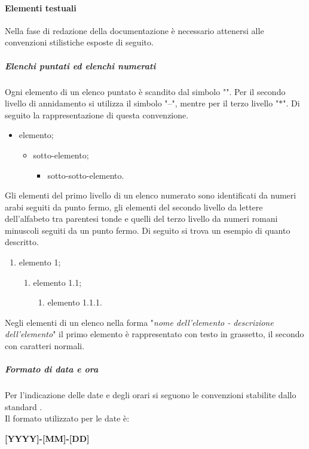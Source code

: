 \paragraph{Elementi testuali}
Nella fase di redazione della documentazione è necessario attenersi alle convenzioni stilistiche esposte di seguito.
\subparagraph{Elenchi puntati ed elenchi numerati}
Ogni elemento di un elenco puntato è scandito dal simbolo "\textbullet". Per il secondo livello di annidamento si utilizza il simbolo "--", mentre per il terzo livello "$\ast$". Di seguito la rappresentazione di questa convenzione.
\begin{itemize}
    \item elemento;
    \begin{itemize}
        \item sotto-elemento;
        \begin{itemize}
            \item sotto-sotto-elemento.
        \end{itemize}
    \end{itemize}
\end{itemize}
Gli elementi del primo livello di un elenco numerato sono identificati da numeri arabi seguiti da punto fermo, gli elementi del secondo livello da lettere dell'alfabeto tra parentesi tonde e quelli del terzo livello da numeri romani minuscoli seguiti da  un punto fermo. Di seguito si trova un esempio di quanto descritto.
\begin{enumerate}
    \item elemento 1;
    \begin{enumerate}
        \item elemento 1.1;
        \begin{enumerate}
            \item elemento 1.1.1.
        \end{enumerate}
    \end{enumerate}
\end{enumerate}
Negli elementi di un elenco nella forma "\textit{nome dell'elemento - descrizione dell'elemento}"  il primo elemento è rappresentato con testo in grassetto, il secondo con caratteri normali.
\subparagraph{Formato di data e ora}
Per l'indicazione delle date e degli orari si seguono le convenzioni stabilite dallo standard . \\
Il formato utilizzato per le date è:
\begin{center}
    \textbf{[YYYY]-[MM]-[DD]}
\end{center}

